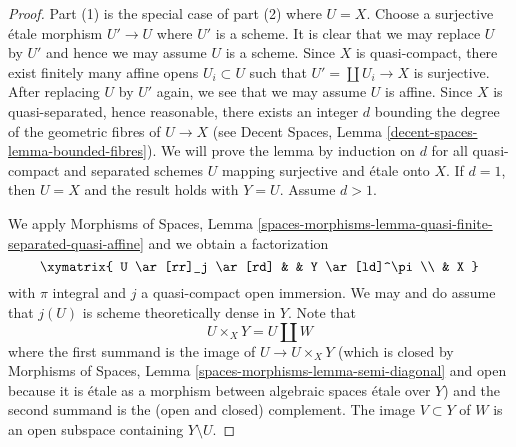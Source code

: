 \begin{proof}
Part (1) is the special case of part (2) where $U = X$.
Choose a surjective \'etale morphism $U' \to U$
where $U'$ is a scheme. It is clear that we may replace $U$ by $U'$
and hence we may assume $U$ is a scheme. Since $X$ is quasi-compact,
there exist finitely many affine opens $U_i \subset U$ such that
$U' = \coprod U_i \to X$ is surjective.
After replacing $U$ by $U'$ again, we see that we may assume $U$ is affine.
Since $X$ is quasi-separated, hence reasonable, there exists an integer
$d$ bounding the degree of the geometric fibres of $U \to X$
(see Decent Spaces, Lemma \ref{decent-spaces-lemma-bounded-fibres}).
We will prove the lemma by induction on $d$ for all quasi-compact
and separated schemes $U$ mapping surjective and \'etale onto $X$.
If $d = 1$, then $U = X$ and the result holds with $Y = U$.
Assume $d > 1$.

\medskip\noindent
We apply Morphisms of Spaces, Lemma
\ref{spaces-morphisms-lemma-quasi-finite-separated-quasi-affine}
and we obtain a factorization
$$
\xymatrix{
U \ar[rr]_j \ar[rd] & & Y \ar[ld]^\pi \\
& X
}
$$
with $\pi$ integral and $j$ a quasi-compact open immersion. We may and do
assume that $j(U)$ is scheme theoretically dense in $Y$. Note that
$$
U \times_X Y = U \amalg W
$$
where the first summand is the image of $U \to U \times_X Y$
(which is closed by
Morphisms of Spaces, Lemma \ref{spaces-morphisms-lemma-semi-diagonal}
and open because it is \'etale as a morphism between
algebraic spaces \'etale over $Y$) and
the second summand is the (open and closed) complement.
The image $V \subset Y$ of $W$ is an open subspace containing
$Y \setminus U$.


\end{proof}
